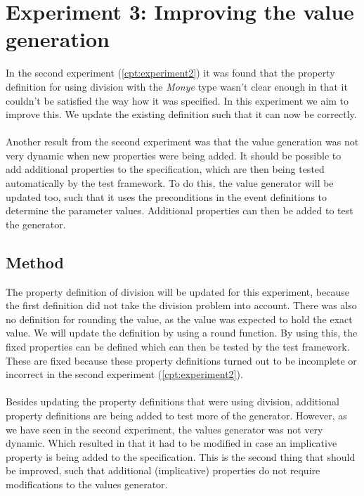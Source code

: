 \chapter{Experiment 3: Improving the value generation}
\label{cpt:experiment3}
In the second experiment (\autoref{cpt:experiment2}) it was found that the
property definition for using division with the \textit{Monye} type wasn't clear
enough in that it couldn't be satisfied the way how it was specified. In this
experiment we aim to improve this. We update the existing definition such that
it can now be correctly.\\
\\
Another result from the second experiment was that the value generation was not
very dynamic when new properties were being added. It should be possible to add
additional properties to the specification, which are then being tested
automatically by the test framework. To do this, the value generator will be
updated too, such that it uses the preconditions in the event definitions to
determine the parameter values. Additional properties can then be added to test
the generator.


\section{Method}
The property definition of division will be updated for this experiment, because
the first definition did not take the division problem into account. There was
also no definition for rounding the value, as the value was expected to hold the
exact value. We will update the definition by using a round function. By using
this, the fixed properties can be defined which can then be tested by the test
framework. These are fixed because these property definitions turned out to be
incomplete or incorrect in the second experiment (\autoref{cpt:experiment2}).\\
\\
Besides updating the property definitions that were using division, additional
property definitions are being added to test more of the generator. However, as
we have seen in the second experiment, the values generator was not very
dynamic. Which resulted in that it had to be modified in case an implicative
property is being added to the specification. This is the second thing that
should be improved, such that additional (implicative) properties do not require
modifications to the values generator.

